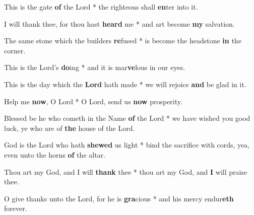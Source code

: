 \begin{multicols}{2}
	This is the gate \textbf{of} the Lord * the righteous shall \textbf{en}ter into it.
	
	I will thank thee, for thou hast \textbf{heard} me * and art become \textbf{my} salvation.
	
	The same stone which the builders \textbf{re}fused * is become the headstone \textbf{in} the corner.
	
	This is the Lord's \textbf{do}ing * and it is mar\textbf{ve}lous in our eyes.
	
	This is the day which the \textbf{Lord} hath made * we will rejoice \textbf{and} be glad in it.
	
	Help me \textbf{now}, O Lord * O Lord, send us \textbf{now} prosperity.
	
	Blessed be he who cometh in the Name \textbf{of} the Lord * we have wished you good luck, ye who are of \textbf{the} house of the Lord.
	
	God is the Lord who hath \textbf{shewed} us light * bind the sacrifice with cords, yea, even unto the horns \textbf{of} the altar.
	
	Thou art my God, and I will \textbf{thank} thee * thou art my God, and \textbf{I} will praise thee.
	
	O give thanks unto the Lord, for he is \textbf{gra}cious * and his mercy endur\textbf{eth} forever.
\end{multicols}